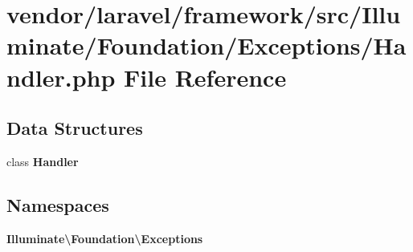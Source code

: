 \section{vendor/laravel/framework/src/\+Illuminate/\+Foundation/\+Exceptions/\+Handler.php File Reference}
\label{vendor_2laravel_2framework_2src_2_illuminate_2_foundation_2_exceptions_2_handler_8php}
\subsection*{Data Structures}
\begin{DoxyCompactItemize}
\item 
class {\bf Handler}
\end{DoxyCompactItemize}
\subsection*{Namespaces}
\begin{DoxyCompactItemize}
\item 
 {\bf Illuminate\textbackslash{}\+Foundation\textbackslash{}\+Exceptions}
\end{DoxyCompactItemize}
